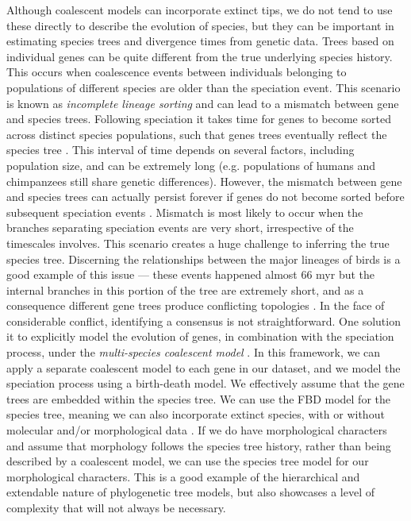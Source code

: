 Although coalescent models can incorporate extinct tips, we do not tend to use these directly to describe the evolution of species, but they can be important in estimating species trees and divergence times from genetic data. %
Trees based on individual genes can be quite different from the true underlying species history. 
This occurs when coalescence events between individuals belonging to populations of different species are older than the speciation event.
This scenario is known as \textit{incomplete lineage sorting} and can lead to a mismatch between gene and species trees.
Following speciation it takes time for genes to become sorted across distinct species populations, such that genes trees  eventually reflect the species tree \citep{Maddison2006}.
This interval of time depends on several factors, including population size, and can be extremely long (e.g. populations of humans and chimpanzees still share genetic differences). 
However, the mismatch between gene and species trees can actually persist forever if genes do not become sorted before subsequent speciation events \citep{Xu2016}. 
Mismatch is most likely to occur when the branches separating speciation events are very short, irrespective of the timescales involves. This scenario creates a huge challenge to inferring the true species tree.
Discerning the relationships between the major lineages of birds is a good example of this issue --- these events happened almost 66 myr but the internal branches in this portion of the tree are extremely short, and as a consequence different gene trees produce conflicting topologies \citep{Jarvis2014}.
In the face of considerable conflict, identifying a consensus is not straightforward. 
One solution it to explicitly model the evolution of genes, in combination with the speciation process, under the \textit{multi-species coalescent model} \citep{Heled2010}.
In this framework, we can apply a separate coalescent model to each gene in our dataset, and we model the speciation process using a birth-death model. 
We effectively assume that the gene trees are embedded within the species tree.
We can use the FBD model for the species tree, meaning we can also incorporate extinct species, with or without molecular and/or morphological data \citep{ogilvie2018}.
If we do have morphological characters and assume that morphology follows the species tree history, rather than being described by a coalescent model, we can use the species tree model for our morphological characters.
This is a good example of the hierarchical and extendable nature of phylogenetic tree models, but also showcases a level of complexity that will not always be necessary.

